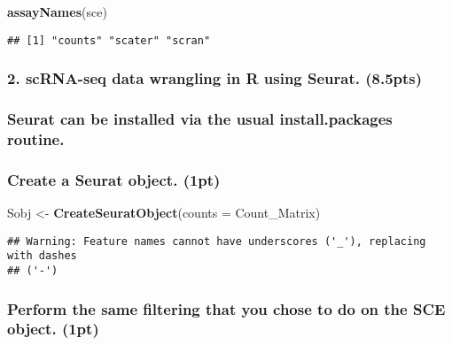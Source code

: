 \documentclass[]{article}
\newenvironment{Shaded}{\begin{snugshade}}{\end{snugshade}}
\newcommand{\KeywordTok}[1]{\textcolor[rgb]{0.13,0.29,0.53}{\textbf{#1}}}
\newcommand{\DataTypeTok}[1]{\textcolor[rgb]{0.13,0.29,0.53}{#1}}
\newcommand{\StringTok}[1]{\textcolor[rgb]{0.31,0.60,0.02}{#1}}
\newcommand{\NormalTok}[1]{#1}
\begin{document}
\begin{Shaded}
\begin{Highlighting}[]
\KeywordTok{assayNames}\NormalTok{(sce)}
\end{Highlighting}
\end{Shaded}

\begin{verbatim}
## [1] "counts" "scater" "scran"
\end{verbatim}

\subsubsection{2. scRNA-seq data wrangling in R using Seurat.
(8.5pts)}\label{scrna-seq-data-wrangling-in-r-using-seurat.-8.5pts}

\subsubsection{Seurat can be installed via the usual install.packages
routine.}\label{seurat-can-be-installed-via-the-usual-install.packages-routine.}

\subsubsection{Create a Seurat object.
(1pt)}\label{create-a-seurat-object.-1pt}

\begin{Shaded}
\begin{Highlighting}[]
\NormalTok{Sobj <-}\StringTok{ }\KeywordTok{CreateSeuratObject}\NormalTok{(}\DataTypeTok{counts =}\NormalTok{ Count_Matrix)}
\end{Highlighting}
\end{Shaded}

\begin{verbatim}
## Warning: Feature names cannot have underscores ('_'), replacing with dashes
## ('-')
\end{verbatim}

\subsubsection{Perform the same filtering that you chose to do on the
SCE object.
(1pt)}\label{perform-the-same-filtering-that-you-chose-to-do-on-the-sce-object.-1pt}
\end{document}
